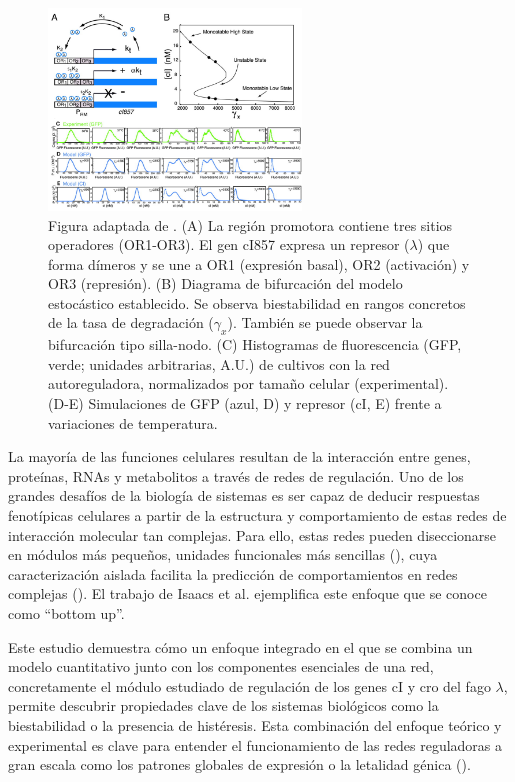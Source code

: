 \documentclass[nochap]{config/ejercicios}
\begin{document}
\begin{figure}[h]
\centering
\includegraphics[width = 0.6\textwidth]{figura_mod.png}
\caption{Figura adaptada de \cite{Isaacs2003}. (A) La región promotora contiene tres sitios operadores (OR1-OR3). El gen cI857 expresa un represor ($\lambda$) que forma dímeros y se une a OR1 (expresión basal), OR2 (activación) y OR3 (represión). (B) Diagrama de bifurcación del modelo estocástico establecido. Se observa biestabilidad en rangos concretos de la tasa de degradación ($\gamma_x$). También se puede observar la bifurcación tipo silla-nodo. (C) Histogramas de fluorescencia (GFP, verde; unidades arbitrarias, A.U.) de cultivos con la red autoreguladora, normalizados por tamaño celular (experimental). (D-E) Simulaciones de GFP (azul, D) y represor (cI, E) frente a variaciones de temperatura.}
\end{figure}

La mayoría de las funciones celulares resultan de la interacción entre genes, proteínas, RNAs y metabolitos a través de redes de regulación. Uno de los grandes desafíos de la biología de sistemas es ser capaz de deducir respuestas fenotípicas celulares a partir de la estructura y comportamiento de estas redes de interacción molecular tan complejas. Para ello, estas redes pueden diseccionarse en módulos más pequeños, unidades funcionales más sencillas (\cite{Hartwell1999}), cuya caracterización aislada facilita la predicción de comportamientos en redes complejas (\cite{Arnone1997}). El trabajo de Isaacs et al. ejemplifica este enfoque que se conoce como “bottom up”.

Este estudio demuestra cómo un enfoque integrado en el que se combina un modelo cuantitativo junto con los componentes esenciales de una red, concretamente el módulo estudiado de regulación de los genes cI y cro del fago $\lambda$, permite descubrir propiedades clave de los sistemas biológicos como la biestabilidad o la presencia de histéresis. Esta combinación del enfoque teórico y experimental es clave para entender el funcionamiento de las redes reguladoras a gran escala como los patrones globales de expresión o la letalidad génica (\cite{Hartwell1999}).
\end{document}
